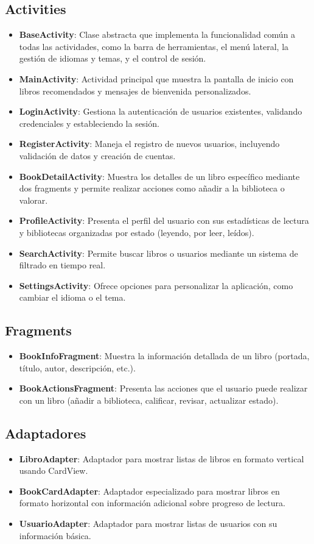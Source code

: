 \documentclass[a4paper,12pt]{report}
\begin{document}
      \subsection{Activities}
      \begin{itemize}
        \item \textbf{BaseActivity}: Clase abstracta que implementa la funcionalidad común a todas las actividades, como la barra de herramientas, el menú lateral, la gestión de idiomas y temas, y el control de sesión.
        \item \textbf{MainActivity}: Actividad principal que muestra la pantalla de inicio con libros recomendados y mensajes de bienvenida personalizados.
        \item \textbf{LoginActivity}: Gestiona la autenticación de usuarios existentes, validando credenciales y estableciendo la sesión.
        \item \textbf{RegisterActivity}: Maneja el registro de nuevos usuarios, incluyendo validación de datos y creación de cuentas.
        \item \textbf{BookDetailActivity}: Muestra los detalles de un libro específico mediante dos fragments y permite realizar acciones como añadir a la biblioteca o valorar.
        \item \textbf{ProfileActivity}: Presenta el perfil del usuario con sus estadísticas de lectura y bibliotecas organizadas por estado (leyendo, por leer, leídos).
        \item \textbf{SearchActivity}: Permite buscar libros o usuarios mediante un sistema de filtrado en tiempo real.
        \item \textbf{SettingsActivity}: Ofrece opciones para personalizar la aplicación, como cambiar el idioma o el tema.
      \end{itemize}
      \subsection{Fragments}
      \begin{itemize}
        \item \textbf{BookInfoFragment}: Muestra la información detallada de un libro (portada, título, autor, descripción, etc.).
        \item \textbf{BookActionsFragment}: Presenta las acciones que el usuario puede realizar con un libro (añadir a biblioteca, calificar, revisar, actualizar estado).
      \end{itemize}
      \subsection{Adaptadores}
      \begin{itemize}
        \item \textbf{LibroAdapter}: Adaptador para mostrar listas de libros en formato vertical usando CardView.
        \item \textbf{BookCardAdapter}: Adaptador especializado para mostrar libros en formato horizontal con información adicional sobre progreso de lectura.
        \item \textbf{UsuarioAdapter}: Adaptador para mostrar listas de usuarios con su información básica.
      \end{itemize}
\end{document}
